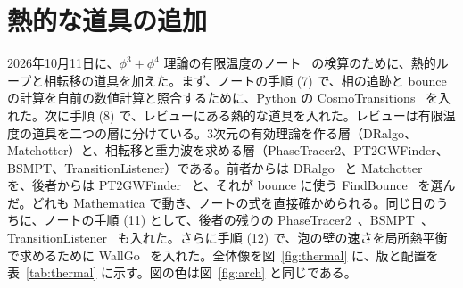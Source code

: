 \documentclass[a4paper,10pt]{ltjsarticle}
\begin{document}
\section{熱的な道具の追加}\label{sec:thermal}

2026年10月11日に、$\phi^3+\phi^4$ 理論の有限温度のノート~\cite{phi34thermal} の検算のために、熱的ループと相転移の道具を加えた。まず、ノートの手順 (7) で、相の追跡と bounce の計算を自前の数値計算と照合するために、Python の CosmoTransitions~\cite{cosmotransitions} を入れた。次に手順 (8) で、レビューにある熱的な道具を入れた。レビューは有限温度の道具を二つの層に分けている。3次元の有効理論を作る層（DRalgo、Matchotter）と、相転移と重力波を求める層（PhaseTracer2、PT2GWFinder、BSMPT、TransitionListener）である。前者からは DRalgo~\cite{dralgo} と Matchotter~\cite{matchotter} を、後者からは PT2GWFinder~\cite{pt2gw} と、それが bounce に使う FindBounce~\cite{findbounce} を選んだ。どれも Mathematica で動き、ノートの式を直接確かめられる。同じ日のうちに、ノートの手順 (11) として、後者の残りの PhaseTracer2~\cite{phasetracer2}、BSMPT~\cite{bsmpt3}、TransitionListener~\cite{tl2} も入れた。さらに手順 (12) で、泡の壁の速さを局所熱平衡で求めるために WallGo~\cite{wallgo} を入れた。全体像を図~\ref{fig:thermal} に、版と配置を表~\ref{tab:thermal} に示す。図の色は図~\ref{fig:arch} と同じである。
\end{document}
